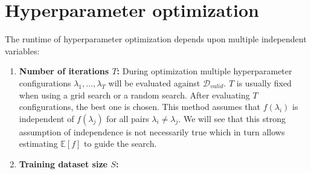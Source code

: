 
\chapter{Hyperparameter optimization}%
\label{sec:hyperparams}

The runtime of hyperparameter optimization depends upon multiple independent variables:
\begin{enumerate}
	\item \textbf{Number of iterations \(T\):}
		During optimization multiple hyperparameter configurations \(\lambda_1, \dots, \lambda_T\) will be evaluated against \(\mathcal{D}_{\mathit{valid}}\).
		\(T\) is usually fixed when using a grid search or a random search.
		After evaluating \(T\) configurations, the best one is chosen.
		This method assumes that \(f(\lambda_i)\) is independent of \(f(\lambda_j)\) for all pairs \(\lambda_i \neq \lambda_j\).
		We will see that this strong assumption of independence is not necessarily true which in turn allows estimating \(\mathbb{E}[f]\) to guide the search.
	\item \textbf{Training dataset size \(S\):}
\end{enumerate}
